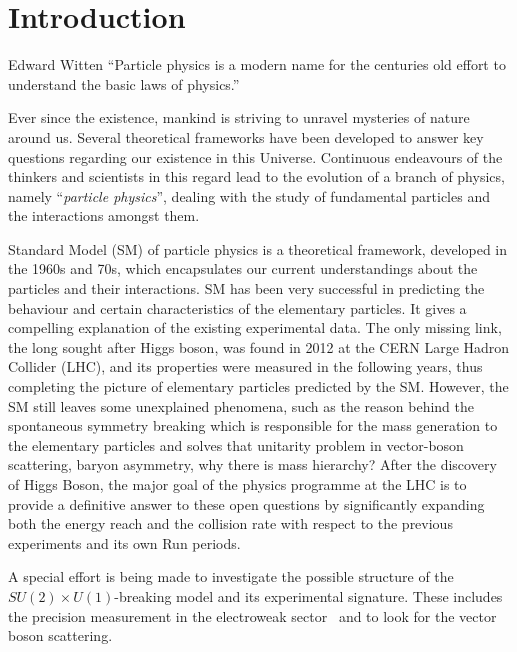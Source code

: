 \chapter{Introduction} %
\label{cha:standard_model__vector_boson_scattering}

\begin{chapquote}
{Edward Witten}
``Particle physics is a modern name for the centuries old effort to understand the basic laws of physics.''
\end{chapquote}
Ever since the existence, mankind is striving to unravel mysteries of nature around us. Several theoretical frameworks have been developed to answer key questions regarding our existence in this Universe. Continuous endeavours of the thinkers and scientists in this regard lead to the evolution of a branch of physics, namely ``\textit{particle physics}'', dealing with the study of fundamental particles and the interactions amongst them. 

Standard Model (SM) of particle physics is a theoretical framework, developed in the 1960s and 70s, which encapsulates our current understandings about the particles and their interactions.
SM has been very successful in predicting the behaviour and certain characteristics of the elementary particles. It gives a compelling explanation of the existing experimental data.
The only missing link, the long sought after Higgs boson, was found in 2012 at the CERN Large Hadron Collider (LHC), and its properties were measured in the following years, thus completing the picture of elementary particles predicted by the SM.
However, the SM still leaves some unexplained phenomena, such as the reason behind the spontaneous symmetry breaking which is responsible for the mass generation to the elementary particles and solves that unitarity problem in vector-boson scattering, baryon asymmetry, why there is mass hierarchy?
After the discovery of Higgs Boson, the major goal of the physics programme at the LHC is to provide a definitive answer to these open questions by significantly expanding both the energy reach and the collision rate with respect to the previous experiments and its own Run periods.

A special effort is being made to investigate the possible structure of the $SU(2)\times U(1)$-breaking model and its experimental signature. These includes the precision measurement in the electroweak sector~\cite{Baak2013} and to look for the vector boson scattering.

